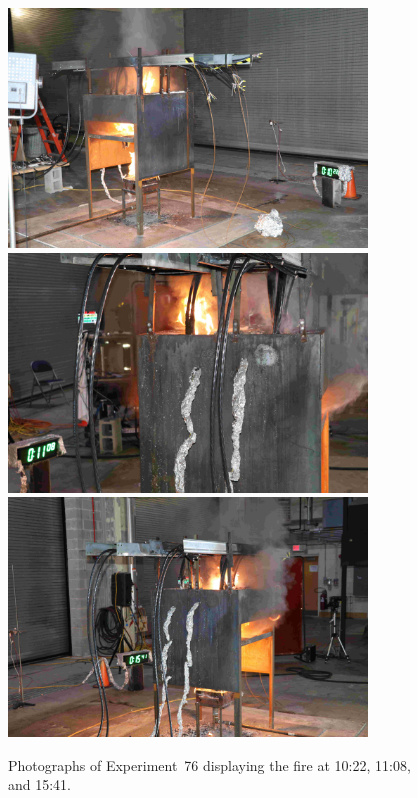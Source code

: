 \begin{figure}[p]
\centering
\includegraphics[height=2.50in]{../FIGURES/Test_76_Photo_1} \\ \vspace{0.1in}
\includegraphics[height=2.50in]{../FIGURES/Test_76_Photo_2} \\ \vspace{0.1in}
\includegraphics[height=2.50in]{../FIGURES/Test_76_Photo_3}
\caption[Photographs of Experiment~76]{Photographs of Experiment~76 displaying the fire at 10:22, 11:08, and 15:41.}
\label{fig:Test_76_photos}
\end{figure}


\clearpage

